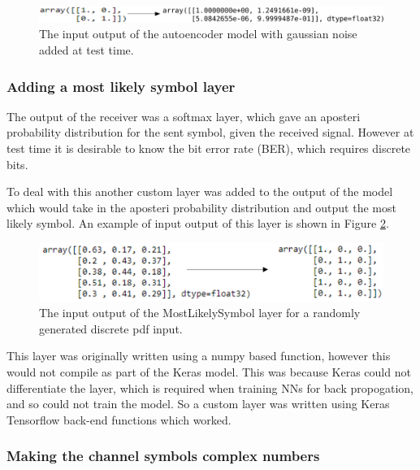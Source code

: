\documentclass[12pt,onecolumn,letterpaper]{article}
\begin{document}
\begin{figure}[t]
\begin{center}
   \includegraphics[width=0.8\linewidth]{figures/ae1_1_with_noise.png}
\end{center}
   \caption{The input output of the autoencoder model with gaussian noise added at test time. }
\label{fig:CodeGaussianNoise2}
\end{figure}

\subsubsection{Adding a most likely symbol layer}

The output of the receiver was a softmax layer, which gave an aposteri probability distribution for the sent symbol, given the received signal. However at test time it is desirable to know the bit error rate (BER), which requires discrete bits.

To deal with this another custom layer was added to the output of the model which would take in the aposteri probability distribution and output the most likely symbol. An example of input output of this layer is shown in Figure \ref{fig:MostLikelySymbolLayer}.

\begin{figure}[t]
\begin{center}
   \includegraphics[width=0.8\linewidth]{figures/most_likely_symbol_io.PNG}
\end{center}
   \caption{The input output of the MostLikelySymbol layer for a randomly generated discrete pdf input. }
\label{fig:MostLikelySymbolLayer}
\end{figure}

This layer was originally written using a numpy based function, however this would not compile as part of the Keras model. This was because Keras could not differentiate the layer, which is required when training NNs for back propogation, and so could not train the model. So a custom layer was written using Keras Tensorflow back-end functions which worked.

\subsubsection{Making the channel symbols complex numbers}
\end{document}
